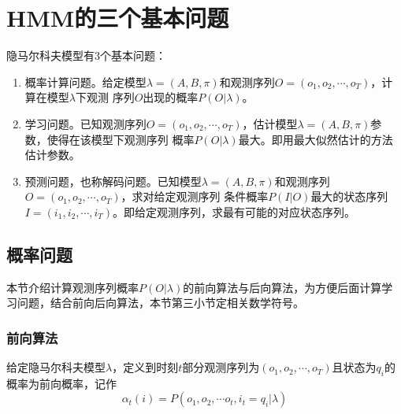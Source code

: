 \section{HMM的三个基本问题}
    隐马尔科夫模型有3个基本问题：
    \vspace{-10pt}
    \begin{enumerate}
        \item 概率计算问题。给定模型$\lambda  = \left( {A,B,\pi } \right)$和观测序列$O = ({o_1},{o_2},\cdots,{o_T})$，计算在模型$\lambda$下观测
            序列$O$出现的概率$P(O|\lambda )$。
        \item 学习问题。已知观测序列$O = ({o_1},{o_2},\cdots,{o_T})$，估计模型$\lambda  = \left( {A,B,\pi } \right)$参数，使得在该模型下观测序列
            概率$P(O|\lambda )$最大。即用最大似然估计的方法估计参数。
        \item 预测问题，也称解码问题。已知模型$\lambda  = \left( {A,B,\pi } \right)$和观测序列$O = ({o_1},{o_2},\cdots,{o_T})$，求对给定观测序列
            条件概率$P(I|O)$最大的状态序列$I = ({i_1},{i_2},\cdots,{i_T})$。即给定观测序列，求最有可能的对应状态序列。
    \end{enumerate}
    \vspace{-10pt}

    \subsection{概率问题}\label{section:probability}
    本节介绍计算观测序列概率$P(O|\lambda )$的前向算法与后向算法，为方便后面计算学习问题，结合前向后向算法，本节第三小节定相关数学符号。
        \subsubsection{前向算法}
        \begin{definition}[前向算法]
            给定隐马尔科夫模型$\lambda$，定义到时刻$t$部分观测序列为$({o_1},{o_2},\cdots,{o_T})$且状态为$q_i$的概率为前向概率，记作
            \begin{equation}
            {\alpha _t}(i) = P({o_1},{o_2}, \cdots {o_t},{i_t} = {q_i}|\lambda )
            \end{equation}
        \end{definition}

